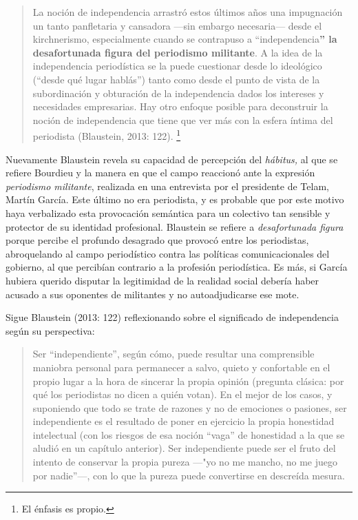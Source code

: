 {\begin{quote}
La noción de independencia arrastró estos últimos años una impugnación un tanto panfletaria y cansadora ---sin embargo necesaria--- desde el kirchnerismo, especialmente cuando se contrapuso a ``independencia\textbf{'' la desafortunada figura del periodismo militante}. A la idea de la independencia periodística se la puede cuestionar desde lo ideológico (``desde qué lugar hablás'') tanto como desde el punto de vista de la subordinación y obturación de la independencia dados los intereses y necesidades empresarias. Hay otro enfoque posible para deconstruir la noción de independencia que tiene que ver más con la esfera íntima del periodista (Blaustein, 2013: 122). \footnote{El énfasis es propio.}
\end{quote}

Nuevamente Blaustein revela su capacidad de percepción del \emph{hábitus,} al que se refiere Bourdieu y la manera en que el campo reaccionó ante la expresión \emph{periodismo militante}, realizada en una entrevista por el presidente de Telam, Martín García. Este último no era periodista, y es probable que por este motivo haya verbalizado esta provocación semántica para un colectivo tan sensible y protector de su identidad profesional. Blaustein se refiere a \emph{desafortunada figura} porque percibe el profundo desagrado que provocó entre los periodistas, abroquelando al campo periodístico contra las políticas comunicacionales del gobierno, al que percibían contrario a la profesión periodística. Es más, si García hubiera querido disputar la legitimidad de la realidad social debería haber acusado a sus oponentes de militantes y no autoadjudicarse ese mote.

Sigue Blaustein (2013: 122) reflexionando sobre el significado de independencia según su perspectiva:

\begin{quote}
Ser ``independiente'', según cómo, puede resultar una comprensible maniobra personal para permanecer a salvo, quieto y confortable en el propio lugar a la hora de sincerar la propia opinión (pregunta clásica: por qué los periodistas no dicen a quién votan). En el mejor de los casos, y suponiendo que todo se trate de razones y no de emociones o pasiones, ser independiente es el resultado de poner en ejercicio la propia honestidad intelectual (con los riesgos de esa noción ``vaga'' de honestidad a la que se aludió en un capítulo anterior). Ser independiente puede ser el fruto del intento de conservar la propia pureza ---"yo no me mancho, no me juego por nadie''---, con lo que la pureza puede convertirse en descreída mesura.
\end{quote}

}
